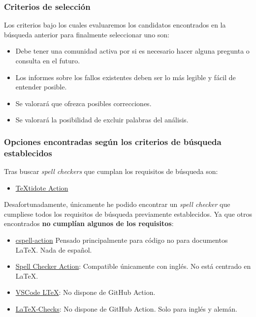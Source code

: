 \subsubsection{Criterios de selección}

Los criterios bajo los cuales evaluaremos los candidatos encontrados en la
búsqueda anterior para finalmente seleccionar uno son:
\begin{itemize}
    \item Debe tener una comunidad activa por si es necesario hacer alguna
    pregunta o consulta en el futuro.
    \item Los informes sobre los fallos existentes deben ser lo más legible y
    fácil de entender posible.
    \item Se valorará que ofrezca posibles correcciones.
    \item Se valorará la posibilidad de excluir palabras del análisis. 

\end{itemize}


\subsubsection{Opciones encontradas según los criterios de búsqueda establecidos}

Tras buscar \emph{spell checkers} que cumplan los requisitos de búsqueda son:

\begin{itemize}
    \item \href{https://github.com/marketplace/actions/textidote-action}{TeXtidote Action}
\end{itemize}

Desafortunadamente, únicamente he podido encontrar un \emph{spell checker} que
cumpliese todos los requisitos de búsqueda previamente establecidos. Ya que otros
encontrados \textbf{no cumplían algunos de los requisitos}:
\begin{itemize}
    \item \href{https://github.com/marketplace/actions/cspell-action}{cspell-action} Pensado principalmente para código no para documentos LaTeX. Nada de español.
    \item \href{https://github.com/marketplace/actions/spell-checker-action}{Spell Checker Action}: Compatible únicamente con inglés. No está centrado en LaTeX. 
    \item \href{https://github.com/valentjn/vscode-ltex}{VSCode LTeX}: No dispone de GitHub Action.
    \item \href{https://github.com/erodner/latex-checks}{LaTeX-Checks}: No dispone de GitHub Action. Solo para inglés y alemán.
\end{itemize}

